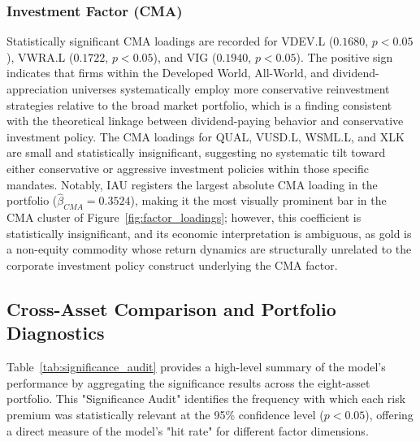 \documentclass[12pt]{article}
\begin{document}
\subsubsection{Investment Factor (CMA)}
Statistically significant CMA loadings are recorded for VDEV.L ($0.1680$, $p < 0.05$), VWRA.L ($0.1722$, $p < 0.05$), and VIG ($0.1940$, $p < 0.05$). The positive sign indicates that firms within the Developed World, All-World, and dividend-appreciation universes systematically employ more conservative reinvestment strategies relative to the broad market portfolio, which is a finding consistent with the theoretical linkage between dividend-paying behavior and conservative investment policy. The CMA loadings for QUAL, VUSD.L, WSML.L, and XLK are small and statistically insignificant, suggesting no systematic tilt toward either conservative or aggressive investment policies within those specific mandates. Notably, IAU registers the largest absolute CMA loading in the portfolio ($\hat{\beta}_{CMA} = 0.3524$), making it the most visually prominent bar in the CMA cluster of Figure~\ref{fig:factor_loadings}; however, this coefficient is statistically insignificant, and its economic interpretation is ambiguous, as gold is a non-equity commodity whose return dynamics are structurally unrelated to the corporate investment policy construct underlying the CMA factor.

\subsection{Cross-Asset Comparison and Portfolio Diagnostics}

Table~\ref{tab:significance_audit} provides a high-level summary of the model's performance by aggregating the significance results across the eight-asset portfolio. This "Significance Audit" identifies the frequency with which each risk premium was statistically relevant at the 95\% confidence level ($p < 0.05$), offering a direct measure of the model's "hit rate" for different factor dimensions.
\end{document}
